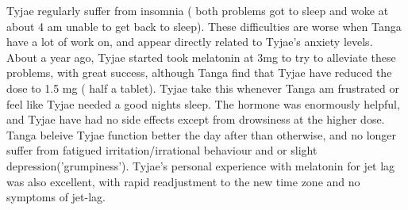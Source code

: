 \documentclass[12pt]{book}
\begin{document}
Tyjae regularly suffer from insomnia ( both problems got to sleep and woke at about 4 am unable to get back to sleep). These difficulties are worse when Tanga have a lot of work on, and appear directly related to Tyjae's anxiety levels. About a year ago, Tyjae started took melatonin at 3mg to try to alleviate these problems, with great success, although Tanga find that Tyjae have reduced the dose to 1.5 mg ( half a tablet). Tyjae take this whenever Tanga am frustrated or feel like Tyjae needed a good nights sleep. The hormone was enormously helpful, and Tyjae have had no side effects except from drowsiness at the higher dose. Tanga beleive Tyjae function better the day after than otherwise, and no longer suffer from fatigued irritation/irrational behaviour and or slight depression('grumpiness'). Tyjae's personal experience with melatonin for jet lag was also excellent, with rapid readjustment to the new time zone and no symptoms of jet-lag.
\end{document}
